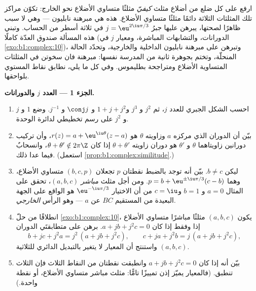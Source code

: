 \begin{problem}\label{pb:b1:complex:1}
ارفع على كل ضلع من أضلاع مثلث \emph{كيفيّ} مثلثًا متساوي
الأضلاع نحو الخارج: تكوّن مراكز تلك المثلثات الثلاثة دائمًا
مثلثًا متساوي الأضلاع. هذه هي مبرهنة نابليون
 --- وهي  لا سبب ظاهرًا لصحتها،
يبرهن عليها جبرُ $j = \eu^{2\iu\pi/3}$ في ثلاثة أسطر من الحساب.
وتبني هذه المسألة صندوق العدّة كاملًا
(الدورانات، والتشابهات المباشرة، ومعيار $j$ في
\cref{exo:b1:complex:10})، وتبرهن على مبرهنة نابليون الداخلية
والخارجية، وتحدّد الحالة المنحلّة، وتختم بجوهرة ثانية
من المدرسة نفسها: مبرهنة فان سخوتن في المثلثات المتساوية الأضلاع
ومتراجحة بطليموس. وفي كل ما يلي، نطابق نقاط المستوي
بلواحقها.

\medskip
\noindent\textbf{الجزء 1 --- العدد $j$ والدورانات.}
\begin{enumerate}
  \item احسب الشكل الجبري للعدد $j$، ثم $j^2$ و $j^3$ و$1 + j
        + j^2$ و $\conj j$ و $j^{-1}$. وضع $1$ و $j$ و $j^2$ على
        رسم تخطيطي لدائرة الوحدة.
  \item بيّن أن الدوران الذي مركزه $a$ وزاويته $\theta$ هو
        $r(z) = a + \eu^{\iu\theta}(z - a)$، وأن
        تركيب دورانين زاويتاهما $\theta$ و
        $\theta'$ هو دوران زاويته $\theta + \theta'$ إذا كان
        $\theta + \theta' \notin 2\pi\Z$، وانسحابٌ فيما عدا
        ذلك. (استعمل \cref{prop:b1:complex:similitude}.)
  \item ليكن $b \neq c$. بيّن أنه توجد بالضبط نقطتان $p$
        تجعلان $(b, c, p)$ متساوي الأضلاع، وهما $p = b +
        \eu^{\pm\iu\pi/3}(c - b)$. ومن أجل مثلث \emph{مباشر}
        $(a, b, c)$، تحقق على المثال $a = 0$ و $b = 1$ و$c =
        \iu$ من أن الاختيار $\eu^{-\iu\pi/3}$ هو الواقع على
        الجهة البعيدة من المستقيم $BC$ عن $a$ --- وهو الرأس
        \emph{الخارجي}.
  \item انطلاقًا من حلّ \cref{exo:b1:complex:10}، يكون $(a, b, c)$
        مثلثًا مباشرًا متساوي الأضلاع إذا وفقط إذا كان
        $a + jb + j^2c = 0$. برهن على متطابقتَي الدوران
        \[
        b + jc + j^2a = j^2\,(a + jb + j^2c),
        \qquad
        c + ja + j^2b = j\,(a + jb + j^2c),
        \]
        واستنتج أن المعيار لا يتغير بالتبديل الدائري
        للثلاثية $(a, b, c)$.
  \item بيّن أنه إذا كان $a + jb + j^2c = 0$ وانطبقت نقطتان من
        النقاط الثلاث فإن الثلاث تنطبق. (فالمعيار يميّز إذن
        تمييزًا تامًّا: مثلث مباشر متساوي الأضلاع، أو نقطة
        واحدة.)
\end{enumerate}


\end{problem}
